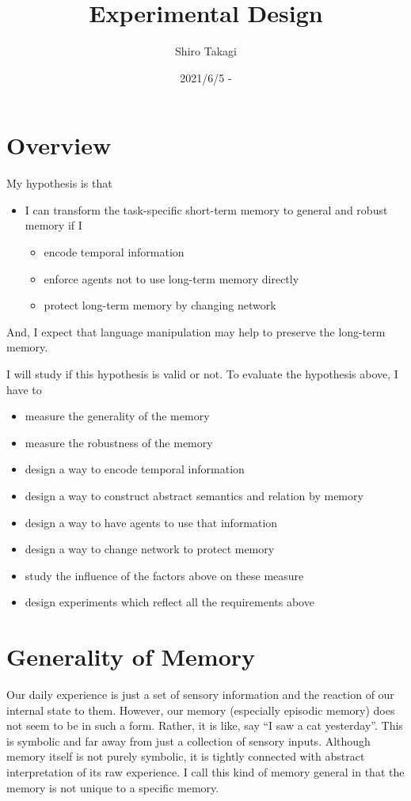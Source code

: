 \documentclass[12pt]{article}
\begin{document}
\title{Experimental Design}
\author{Shiro Takagi}
\date{2021/6/5 -}
\maketitle

\section{Overview}
My hypothesis is that
\begin{itemize}
    \item I can transform the task-specific short-term memory to general and robust memory if I
    \begin{itemize}
        \item encode temporal information
        \item enforce agents not to use long-term memory directly
        \item protect long-term memory by changing network
    \end{itemize}
\end{itemize}
And, I expect that language manipulation may help to preserve the long-term memory.

I will study if this hypothesis is valid or not. To evaluate the hypothesis above, I have to 
\begin{itemize}
    \item measure the generality of the memory
    \item measure the robustness of the memory
    \item design a way to encode temporal information
    \item design a way to construct abstract semantics and relation by memory
    \item design a way to have agents to use that information
    \item design a way to change network to protect memory
    \item study the influence of the factors above on these measure
    \item design experiments which reflect all the requirements above
\end{itemize}

\section{Generality of Memory}
Our daily experience is just a set of sensory information and the reaction of our internal state to them. 
However, our memory (especially episodic memory) does not seem to be in such a form. Rather, it is like, say 
``I saw a cat yesterday''. This is symbolic and far away from just a collection of sensory inputs. Although 
memory itself is not purely symbolic, it is tightly connected with abstract interpretation of its raw experience.
I call this kind of memory general in that the memory is not unique to a specific memory.
\end{document}
